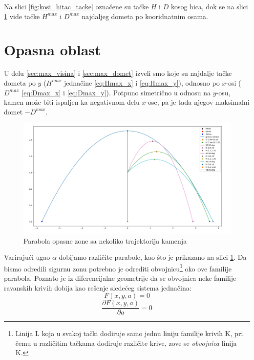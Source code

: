 \documentclass[a4paper]{article}
\begin{document}
Na slici \ref{fig:kosi_hitac_tacke} označene su tačke $H$ i $D$ kosog hica, dok se
na slici \ref{fig:parabola} vide tačke $H^{max}$ i $D^{max}$ najdaljeg dometa po
kooridnatnim osama.


\section{Opasna oblast}
\label{sec:opasna_oblast}
U delu \ref{sec:max_visina} i \ref{sec:max_domet} izveli smo koje su najdalje tačke dometa
po $y$ ($H^{max}$ jednačine \ref{eq:Hmax_x} i \ref{eq:Hmax_y}), 
odnosno po $x$-osi ($D^{max}$ \ref{eq:Dmax_x} i \ref{eq:Dmax_y}). 
Potpuno simetrično u odnosu na $y$-osu, kamen može biti ispaljen ka negativnom delu
$x$-ose, pa je tada njegov maksimalni domet $-D^{max}$.\\

\begin{figure}[h!]
\begin{center}
\includegraphics[width=\textwidth]{2D_parabola_vise.png}
\end{center}
\caption{Parabola opasne zone sa nekoliko trajektorija kamenja}
\label{fig:parabola}
\end{figure}

Varirajući ugao $\alpha$ dobijamo različite parabole, kao što je prikazano na slici 
\ref{fig:parabola}. Da bismo odredili sigurnu zonu potrebno je odrediti 
obvojnicu\footnote{Linija L koja u svakoj tački dodiruje samo jednu 
liniju familije krivih K, pri čemu u različitim tačkama dodiruje različite krive, 
zove se \textit{obvojnica} linija K.}
oko ove familije parabola.
Poznato je iz diferencijalne geometrije da se obvojnica neke familije ravanskih krivih
dobija kao rešenje sledećeg sistema jednačina:
\begin{equation}
\label{eq:obvojnica1}
F(x,y,a) = 0
\end{equation}
\begin{equation}
\label{eq:obvojnica2}
\frac{\partial F(x,y,a)}{\partial a} = 0
\end{equation}
\end{document}
